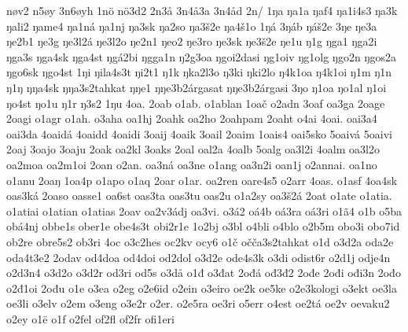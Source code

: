 {    nøv2
    n5øy
    3n6øyh
    1nö
    nö3d2
    2n3å
    3n4å3a
    3n4åd
    2n/
    1ŋa
    ŋa1a
    ŋaf4
    ŋa1i4s3
    ŋa3k
    ŋali2
    ŋame4
    ŋa1ná
    ŋa1nj
    ŋa3sk
    ŋa2so
    ŋa3š2e
    ŋa4š1o
    1ŋá
    3ŋáb
    ŋáš2e
    3ŋe
    ŋe3a
    ŋe2b1
    ŋe3g
    ŋe3l2á
    ŋe3l2o
    ŋe2n1
    ŋeo2
    ŋe3ro
    ŋe3sk
    ŋe3š2e
    ŋe1u
    ŋ1g
    ŋga1
    ŋga2i
    ŋga3s
    ŋga4sk
    ŋga4st
    ŋgá2bi
    ŋgga1n
    ŋ2g3oa
    ŋgoi2dasi
    ŋg1oiv
    ŋg1olg
    ŋgo2n
    ŋgos2a
    ŋgo6sk
    ŋgo4st
    1ŋi
    ŋila4s3t
    ŋi2t1
    ŋ1k
    ŋka2l3o
    ŋ3ki
    ŋki2lo
    ŋ4k1oa
    ŋ4k1oi
    ŋ1m
    ŋ1n
    ŋ1ŋ
    ŋŋa4sk
    ŋŋa3s2tahkat
    ŋŋe1
    ŋŋe3b2árgasat
    ŋŋe3b2árgasi
    3ŋo
    ŋ1oa
    ŋo1al
    ŋ1oi
    ŋo4st
    ŋo1u
    ŋ1r
    ŋ3s2
    1ŋu
    4oa.
    2oab
    o1ab.
    o1ablan
    1oač
    o2adn
    3oaf
    oa3ga
    2oage
    2oagi
    o1agr
    o1ah.
    o3aha
    oa1hj
    2oahk
    oa2ho
    2oahpam
    2oaht
    o4ai
    4oai.
    oai3a4
    oai3da
    4oaidá
    4oaidd
    4oaidi
    3oaij
    4oaik
    3oail
    2oaim
    1oais4
    oai5sko
    5oaivá
    5oaivi
    2oaj
    3oajo
    3oaju
    2oak
    oa2kl
    3oaks
    2oal
    oal2a
    4oalb
    5oalg
    oa3l2i
    4oalm
    oa3l2o
    oa2moa
    oa2m1oi
    2oan
    o2an.
    oa3ná
    oa3ne
    o1ang
    oa3n2i
    oan1j
    o2annai.
    oa1no
    o1anu
    2oaŋ
    1oa4p
    o1apo
    o1aq
    2oar
    o1ar.
    oa2ren
    oare4s5
    o2arr
    4oas.
    o1asf
    4oa4sk
    oas3ká
    2oaso
    oasse1
    oa6st
    oas3ta
    oas3tu
    oas2u
    o1a2sy
    oa3š2á
    2oat
    o1ate
    o1atia.
    o1atiai
    o1atian
    o1atias
    2oav
    oa2v3ádj
    oa3vi.
    o3á2
    oá4b
    oá3ra
    oá3ri
    o1ã4
    o1b
    o5ba
    obá4nj
    obbe1s
    ober1e
    obe4s3t
    obi2r1e
    1o2bj
    o3bl
    o4bli
    o4blo
    o2b5m
    obo3i
    obo7id
    ob2re
    obre5s2
    ob3ri
    4oc
    o3c2hes
    oc2kv
    ocy6
    o1č
    očča3s2tahkat
    o1d
    o3d2a
    oda2e
    oda4t3e2
    2odav
    od4doa
    od4doi
    od2dol
    o3d2e
    ode4s3k
    o3di
    odist6r
    o2d1j
    odje4n
    o2d3n4
    o3d2o
    o3d2r
    od3ri
    od5s
    o3då
    o1đ
    o3đat
    2ođá
    ođ3đ2
    2ođe
    2ođi
    ođi3n
    2ođo
    o2đ1oi
    2ođu
    o1e
    o3ea
    o2eg
    o2e6id
    o2ein
    o3eiro
    oe2k
    oe5ke
    o2e3kologi
    o3ekt
    oe3la
    oe3li
    o3elv
    o2em
    o3eng
    o3e2r
    o2er.
    o2e5ra
    oe3ri
    o5err
    o4est
    oe2tá
    oe2v
    oevaku2
    o2ey
    o1ë
    o1f
    o2fel
    of2fl
    of2fr
    ofi1eri
}
